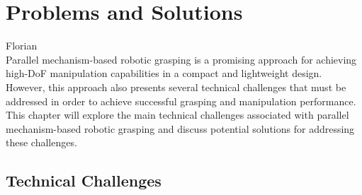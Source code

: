 \documentclass[12pt, twoside]{report}
\begin{document}
\section{Problems and Solutions}
Florian\\

Parallel mechanism-based robotic grasping is a promising approach for achieving high-DoF manipulation capabilities in a compact and lightweight design. However, this approach also presents several technical challenges that must be addressed in order to achieve successful grasping and manipulation performance. This chapter will explore the main technical challenges associated with parallel mechanism-based robotic grasping and discuss potential solutions for addressing these challenges.

\subsection{Technical Challenges}
\end{document}
